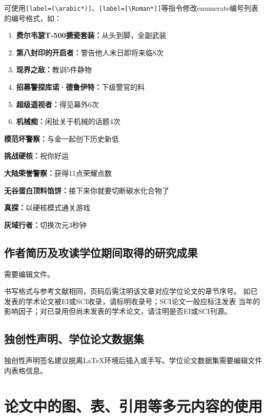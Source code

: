 可使用\texttt{[label=(\textbackslash arabic*)]}、\texttt{[label={[}\textbackslash Roman*{]}]}等指令修改enumerate编号列表的编号格式，如：

\begin{enumerate}[label=(\arabic*)]
    \item \textbf{费尔韦瑟T-500搪瓷套装：}从头到脚，全副武装
    \item \textbf{第八封印的开启者：}警告他人末日即将来临8次
    \item \textbf{现界之敌：}教训5件静物
    \item \textbf{招募警探库诺·德鲁伊特：}下级警官的料
    \item \textbf{超级遥视者：}得见幕外6次
    \item \textbf{机械痴：}闲扯关于机械的话题4次
\end{enumerate}

\begin{enumerate}[label={[}\Roman*{]}]
    \item \textbf{模范坏警察：}与金一起创下历史新低
    \item \textbf{挑战硬核：}祝你好运
    \item \textbf{大陆荣誉警察：}获得11点荣耀点数
    \item \textbf{无谷蛋白顶料馅饼：}接下来你就要切断碳水化合物了
    \item \textbf{真探：}以硬核模式通关游戏
    \item \textbf{灰域行者：}切换次元3秒钟
\end{enumerate}

\subsection{作者简历及攻读学位期间取得的研究成果}
需要编辑文件。

书写格式与参考文献相同，页码后需注明该文章对应学位论文的章节序号。
如已发表的学术论文被EI或SCI收录，请标明收录号；SCI论文一般应标注发表
当年的影响因子；对已录用但尚未发表的学术论文，请注明是否EI或SCI刊源。

\subsection{独创性声明、学位论文数据集}
独创性声明签名建议脱离\LaTeX{}环境后插入或手写。学位论文数据集需要编辑文件内表格信息。

\section{论文中的图、表、引用等多元内容的使用}

